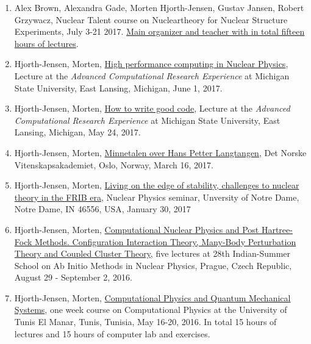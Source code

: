 \documentclass[%
oneside,                 %
final,                   %
10pt]{article}
\begin{document}
\begin{enumerate}
\item Alex Brown, Alexandra Gade, Morten Hjorth-Jensen, Gustav Jansen, Robert Grzywacz, Nuclear Talent course on Nucleartheory for Nuclear Structure Experiments, July 3-21 2017. \href{{https://github.com/NuclearTalent/NuclearStructure}}{Main organizer and teacher with in total fifteen hours of lectures}. 

\item Hjorth-Jensen, Morten, \href{{https://icer-acres.msu.edu/summer-2017/schedule/}}{High performance computing in Nuclear Physics}, Lecture at the \emph{Advanced Computational Research Experience} at Michigan State University, East Lansing, Michigan, June 1, 2017.

\item Hjorth-Jensen, Morten, \href{{https://icer-acres.msu.edu/summer-2017/schedule/}}{How to write good code}, Lecture at the \emph{Advanced Computational Research Experience} at Michigan State University, East Lansing, Michigan, May 24, 2017.

\item Hjorth-Jensen, Morten, \href{{http://www.dnva.no/c26754/kalender/index.html?year=2017&month=3&day=16}}{Minnetalen over Hans Petter Langtangen}, Det Norske Vitenskapsakademiet, Oslo, Norway, March 16, 2017.

\item Hjorth-Jensen, Morten, \href{{https://science.nd.edu/events/2017/01/30/nuclear-physics-seminar-prof-morten-hjorth-jensen/}}{Living on the edge of stability, challenges to nuclear theory in the FRIB era}, Nuclear Physics seminar, Unversity of Notre Dame, Notre Dame, IN 46556, USA, January 30, 2017 

\item Hjorth-Jensen, Morten, \href{{http://rafael.ujf.cas.cz/school}}{Computational Nuclear Physics and Post Hartree-Fock Methods. Configuration Interaction Theory, Many-Body Perturbation Theory and Coupled Cluster Theory}, five lectures at 28th Indian-Summer School on Ab Initio Methods in Nuclear Physics, Prague, Czech Republic, August 29 - September 2, 2016.

\item Hjorth-Jensen, Morten, \href{{http://compphysics.github.io/CompPhysUTunis/doc/web/course.html}}{Computational Physics and Quantum Mechanical Systems}, one week course on Computational Physics at the University of Tunis El Manar, Tunis, Tunisia, May 16-20, 2016. In total 15 hours of lectures and 15 hours of computer lab and exercises. 


\end{enumerate}
\end{document}
